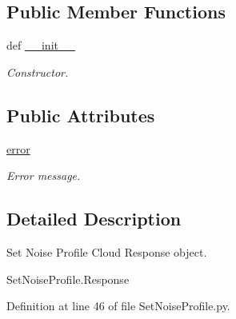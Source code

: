 \subsection*{Public Member Functions}
\begin{DoxyCompactItemize}
\item 
def \hyperlink{classRappCloud_1_1CloudMsgs_1_1SetNoiseProfile_1_1SetNoiseProfile_1_1Response_ad8571a4e3901e46047b76fc033b47a26}{\-\_\-\-\_\-init\-\_\-\-\_\-}
\begin{DoxyCompactList}\small\item\em Constructor. \end{DoxyCompactList}\end{DoxyCompactItemize}
\subsection*{Public Attributes}
\begin{DoxyCompactItemize}
\item 
\hyperlink{classRappCloud_1_1CloudMsgs_1_1SetNoiseProfile_1_1SetNoiseProfile_1_1Response_a3a1aacd54eed4e0a6c0b4fc1ef6e7247}{error}
\begin{DoxyCompactList}\small\item\em Error message. \end{DoxyCompactList}\end{DoxyCompactItemize}


\subsection{Detailed Description}
\begin{DoxyVerb}Set Noise Profile Cloud Response object.

SetNoiseProfile.Response
\end{DoxyVerb}
 

Definition at line 46 of file Set\-Noise\-Profile.\-py.



